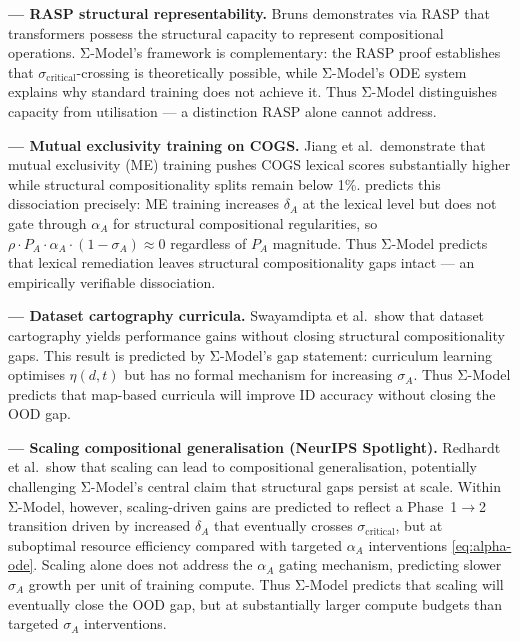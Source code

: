 \documentclass[11pt]{article}
\theoremstyle{definition}
\theoremstyle{plain}
\begin{document}
\textbf{\cite{bruns2025exploringcompositionalgeneralizationin} --- RASP structural representability.}
Bruns demonstrates via RASP that transformers possess the structural capacity
to represent compositional operations. Σ-Model's framework is
complementary: the RASP proof establishes that
$\sigma_{\text{critical}}$-crossing is theoretically possible, while
Σ-Model's ODE system explains why standard training does not achieve it.
Thus Σ-Model distinguishes capacity from utilisation --- a distinction
RASP alone cannot address.

\textbf{\cite{jiang2022mutualexclusivity} --- Mutual exclusivity training on COGS.}
Jiang et al.\ demonstrate that mutual exclusivity (ME) training pushes
COGS lexical scores substantially higher while structural
compositionality splits remain below 1\%. %
predicts this dissociation precisely: ME training increases
$\delta_A$ at the lexical level but does not gate through $\alpha_A$
for structural compositional regularities, so
$\rho \cdot P_A \cdot \alpha_A \cdot (1 - \sigma_A) \approx 0$
regardless of $P_A$ magnitude.
Thus Σ-Model predicts that lexical remediation leaves structural
compositionality gaps intact --- an empirically verifiable dissociation.

\textbf{\cite{swayamdipta2020datasetcartography} --- Dataset cartography curricula.}
Swayamdipta et al.\ show that dataset cartography yields performance
gains without closing structural compositionality gaps. This result is
predicted by Σ-Model's gap statement: curriculum learning optimises
$\eta(d,t)$ but has no formal mechanism for increasing $\sigma_A$.
Thus Σ-Model predicts that map-based curricula will improve ID
accuracy without closing the OOD gap.

\textbf{\cite{redhardt2025} --- Scaling compositional generalisation (NeurIPS Spotlight).}
Redhardt et al.~show that scaling can lead to compositional generalisation,
potentially challenging Σ-Model's central claim that structural gaps persist at
scale. Within Σ-Model, however, scaling-driven gains are predicted to reflect a
Phase~1$\to$2 transition driven by increased $\delta_A$ that eventually crosses
$\sigma_{\text{critical}}$, but at suboptimal resource efficiency compared with
targeted $\alpha_A$ interventions \eqref{eq:alpha-ode}. Scaling alone does not
address the $\alpha_A$ gating mechanism, predicting slower $\sigma_A$ growth per
unit of training compute.
Thus Σ-Model predicts that scaling will eventually close the OOD gap, but at
substantially larger compute budgets than targeted $\sigma_A$ interventions.
\end{document}
